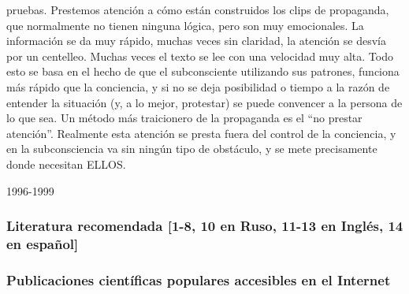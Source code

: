 pruebas. Prestemos atención a cómo están construidos los clips de
propaganda, que normalmente no tienen ninguna lógica, pero son muy
emocionales. La información se da muy rápido, muchas veces sin claridad,
la atención se desvía por un centelleo. Muchas veces el texto se lee con
una velocidad muy alta. Todo esto se basa en el hecho de que el
subconsciente utilizando sus patrones, funciona más rápido que la
conciencia, y si no se deja posibilidad o tiempo a la razón de entender
la situación (y, a lo mejor, protestar) se puede convencer a la persona
de lo que sea. Un método más traicionero de la propaganda es el ``no
prestar atención''. Realmente esta atención se presta fuera del control
de la conciencia, y en la subconsciencia va sin ningún tipo de
obstáculo, y se mete precisamente donde necesitan ELLOS.

1996-1999

\protect\hypertarget{M26}{}{}

\subsubsection{Literatura recomendada {[}1-8, 10 en Ruso, 11-13 en
Inglés, 14 en
español{]}}\label{literatura-recomendada-1-8-10-en-ruso-11-13-en-ingluxe9s-14-en-espauxf1ol}

\subsubsection{Publicaciones científicas populares accesibles en el
Internet}\label{publicaciones-cientuxedficas-populares-accesibles-en-el-internet}

